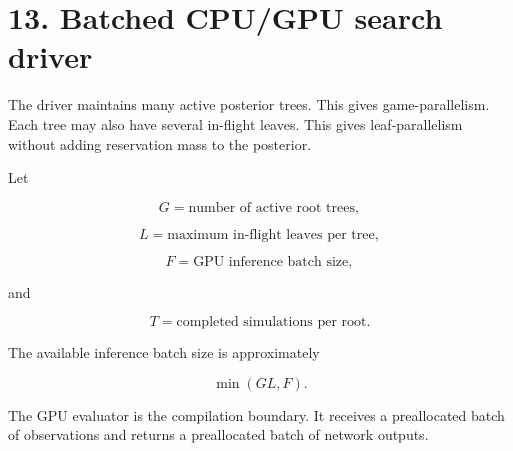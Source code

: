 \documentclass[11pt]{article}
\begin{document}
\section*{13. Batched CPU/GPU search driver}

The driver maintains many active posterior trees. This gives game-parallelism.
Each tree may also have several in-flight leaves. This gives leaf-parallelism
without adding reservation mass to the posterior.

Let

\[
G = \text{number of active root trees},
\]

\[
L = \text{maximum in-flight leaves per tree},
\]

\[
F = \text{GPU inference batch size},
\]

and

\[
T = \text{completed simulations per root}.
\]

The available inference batch size is approximately

\[
\min(GL,F).
\]

The GPU evaluator is the compilation boundary. It receives a preallocated batch
of observations and returns a preallocated batch of network outputs.
\end{document}
